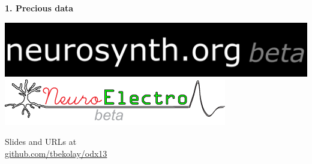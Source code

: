 \documentclass[17pt]{beamer}
\begin{document}
\begin{frame}[plain]
  \vspace{-16pt}
  \begin{center}
    \begin{huge}\textbf{1. Precious data}\end{huge}
  \end{center}
  \vspace{0.5em}
  \begin{center}
    \includegraphics[width=0.8\columnwidth]{neurosynth} \\ \vspace{1em}
    \includegraphics[width=0.8\columnwidth]{neuroelectro}
  \end{center}
\end{frame}

\begin{frame}[plain]
  \begin{center}
    \begin{Large}
      Slides and URLs at \\ \vspace{0.6em}
      \url{github.com/tbekolay/odx13}
    \end{Large}
  \end{center}
\end{frame}
\end{document}

